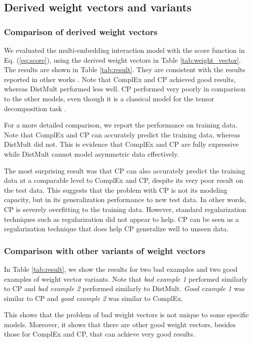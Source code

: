\documentclass[sigconf,edbt]{acmart-edbt2019}
\begin{document}
\subsection{Derived weight vectors and variants}
\subsubsection{Comparison of derived weight vectors } 
We evaluated the multi-embedding interaction model with the score function in Eq. (\ref{eq:score}), using the derived weight vectors in Table \ref{tab:weight_vector}. The results are shown in Table \ref{tab:result}. They are consistent with the results reported in other works \cite{trouillon_complexembeddingssimple_2016}. Note that ComplEx and CP achieved good results, whereas DistMult performed less well. CP performed very poorly in comparison to the other models, even though it is a classical model for the tensor decomposition task \cite{hitchcock_expressiontensorpolyadic_1927}.

For a more detailed comparison, we report the performance on training data. Note that ComplEx and CP can accurately predict the training data, whereas DistMult did not. This is evidence that ComplEx and CP are fully expressive while DistMult cannot model asymmetric data effectively. 

The most surprising result was that CP can also accurately predict the training data at a comparable level to ComplEx and CP, despite its very poor result on the test data. This suggests that the problem with CP is not its modeling capacity, but in its generalization performance to new test data. In other words, CP is severely overfitting to the training data. However, standard regularization techniques such as  regularization did not appear to help. CP can be seen as a regularization technique that does help CP generalize well to unseen data.

\subsubsection{Comparison with other variants of weight vectors} 
In Table \ref{tab:result}, we show the results for two bad examples and two good examples of weight vector variants. Note that \textit{bad example 1} performed similarly to CP and \textit{bad example 2} performed similarly to DistMult. \textit{Good example 1} was similar to CP and \textit{good example 2} was similar to ComplEx.

This shows that the problem of bad weight vectors is not unique to some specific models. Moreover, it shows that there are other good weight vectors, besides those for ComplEx and CP, that can achieve very good results.
\end{document}
